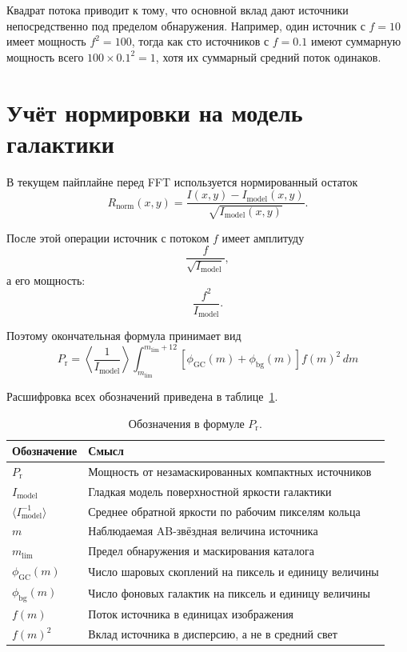 \documentclass[12pt,a4paper]{article}
\newcommand{\Prpow}{P_{\mathrm r}}
\newcommand{\Phigc}{\phi_{\mathrm{GC}}}
\newcommand{\Phibg}{\phi_{\mathrm{bg}}}
\begin{document}
Квадрат потока приводит к тому, что основной вклад дают
источники непосредственно под пределом обнаружения.
Например, один источник с \(f=10\) имеет мощность
\(f^2=100\), тогда как сто источников с \(f=0.1\) имеют
суммарную мощность всего
\(100\times0.1^2=1\), хотя их суммарный средний поток
одинаков.

\section{Учёт нормировки на модель галактики}

В текущем пайплайне перед FFT используется нормированный
остаток
\begin{equation}
    R_{\mathrm{norm}}(x,y)=
    \frac{
        I(x,y)-I_{\mathrm{model}}(x,y)
    }{
        \sqrt{I_{\mathrm{model}}(x,y)}
    }.
\end{equation}

После этой операции источник с потоком \(f\) имеет
амплитуду
\begin{equation}
    \frac{f}{\sqrt{I_{\mathrm{model}}}},
\end{equation}
а его мощность:
\begin{equation}
    \frac{f^2}{I_{\mathrm{model}}}.
\end{equation}

Поэтому окончательная формула принимает вид
\begin{equation}
\boxed{
    \Prpow =
    \left\langle
        \frac{1}{I_{\mathrm{model}}}
    \right\rangle
    \int_{m_{\mathrm{lim}}}^{m_{\mathrm{lim}}+12}
    \left[
        \Phigc(m)+\Phibg(m)
    \right]
    f(m)^2\,dm
}
\end{equation}

Расшифровка всех обозначений приведена в
таблице~\ref{tab:symbols}.

\begin{table}[ht]
\centering
\caption{Обозначения в формуле \(\Prpow\).}
\label{tab:symbols}
\begin{tabular}{p{}p{}}
\toprule
Обозначение & Смысл \\
\midrule
\(\Prpow\) & Мощность от незамаскированных компактных источников \\
\(I_{\mathrm{model}}\) & Гладкая модель поверхностной яркости галактики \\
\(\langle I_{\mathrm{model}}^{-1}\rangle\) & Среднее обратной яркости по рабочим пикселям кольца \\
\(m\) & Наблюдаемая AB-звёздная величина источника \\
\(m_{\mathrm{lim}}\) & Предел обнаружения и маскирования каталога \\
\(\Phigc(m)\) & Число шаровых скоплений на пиксель и единицу величины \\
\(\Phibg(m)\) & Число фоновых галактик на пиксель и единицу величины \\
\(f(m)\) & Поток источника в единицах изображения \\
\(f(m)^2\) & Вклад источника в дисперсию, а не в средний свет \\
\bottomrule
\end{tabular}
\end{table}
\end{document}
